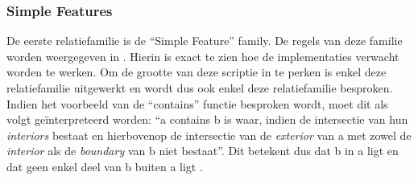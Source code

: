 \subsubsection{Simple Features}
De eerste relatiefamilie is de ``Simple Feature'' family. De regels van deze familie worden weergegeven in . Hierin is exact te zien hoe de implementaties verwacht worden te werken. Om de grootte van deze scriptie in te perken is enkel deze relatiefamilie uitgewerkt en wordt dus ook enkel deze relatiefamilie besproken. Indien het voorbeeld van de ``contains'' functie besproken wordt, moet dit als volgt geïnterpreteerd worden: ``a contains b is waar, indien de intersectie van hun \textit{interiors} bestaat en hierbovenop de intersectie van de \textit{exterior} van a met zowel de \textit{interior} als de \textit{boundary} van b niet bestaat''. Dit betekent dus dat b in a ligt en dat geen enkel deel van b buiten a ligt \cite{ogcdocs}.


